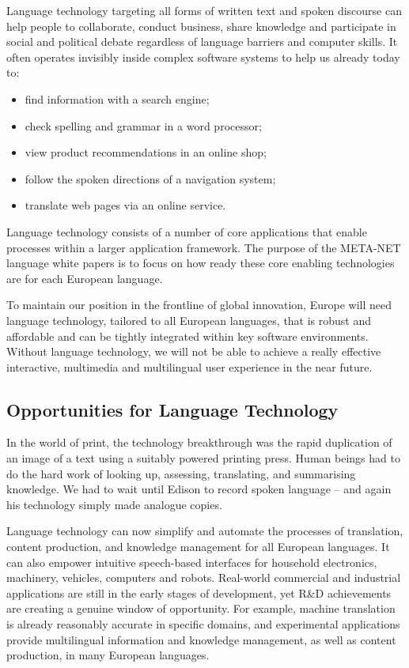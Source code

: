 \begin{multicols}{2}
Language technology targeting all forms of written text and spoken discourse can help people to collaborate, conduct business, share knowledge and participate in social and political debate regardless of language barriers and computer skills. It often operates invisibly inside complex software systems to help us already today to:

\begin{itemize}
\item find information with a search engine;
\item check spelling and grammar in a word processor;
\item view product recommendations in an online shop;
\item follow the spoken directions of a navigation system;
\item translate web pages via an online service.
\end{itemize}

Language technology consists of a number of core applications that enable processes within a larger application framework. The purpose of the META-NET language white papers is to focus on how ready these core enabling technologies are for each European language. 


To maintain our position in the frontline of global innovation, Europe will need language technology, tailored to all European languages, that is robust and affordable and can be tightly integrated within key software environments. Without language technology, we will not be able to achieve a really effective interactive, multimedia and multilingual user experience in the near future.

\subsection{Opportunities for Language Technology}

In the world of print, the technology breakthrough was the rapid duplication of an image of a text using a suitably powered printing press. Human beings had to do the hard work of looking up, assessing, translating, and summarising knowledge. We had to wait until Edison to record spoken language – and again his technology simply made analogue copies.

Language technology can now simplify and automate the processes of translation, content production, and knowledge management for all European languages. It can also empower intuitive speech-based interfaces for household electronics, machinery, vehicles, computers and robots. Real-world commercial and industrial applications are still in the early stages of development, yet R\&D achievements are creating a genuine window of opportunity. For example, machine translation is already reasonably accurate in specific domains, and experimental applications provide multilingual information and knowledge management, as well as content production, in many European languages. 


\end{multicols}

